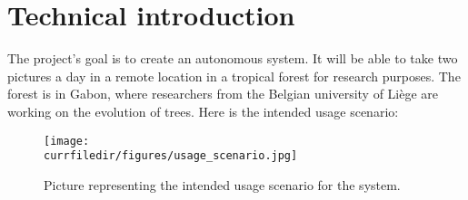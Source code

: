 \newpage
\section*{Technical introduction}

The project's goal is to create an autonomous system. It will be able to take two pictures a day in a remote location in a tropical forest for research purposes. The forest is in Gabon, where researchers from the Belgian university of Liège are working on the evolution of trees.
Here is the intended usage scenario:

\begin{figure}[!h]
    \centering
    \texttt{[image: \\currfiledir/figures/usage\_scenario.jpg]}
    \caption{Picture representing the intended usage scenario for the system.}
\end{figure}